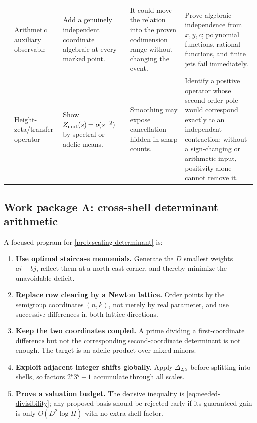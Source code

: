 \documentclass[10pt,oneside]{article}
\theoremstyle{definition}
\theoremstyle{remark}
\begin{document}
\begin{center}
\begin{longtable}{p{}p{}p{}p{}p{}}
\addlinespace
6 & Arithmetic auxiliary observable & Add a genuinely independent coordinate algebraic at every marked point. & It could move the relation into the proven codimension range without changing the event. & Prove algebraic independence from \(x,y,c\); polynomial functions, rational functions, and finite jets fail immediately. \\
\addlinespace
7 & Height-zeta/transfer operator & Show \(Z_{\rm unit}(s)=o(s^{-2})\) by spectral or adelic means. & Smoothing may expose cancellation hidden in sharp counts. & Identify a positive operator whose second-order pole would correspond exactly to an independent contraction; without a sign-changing or arithmetic input, positivity alone cannot remove it. \\
\bottomrule
\end{longtable}
\end{center}

\subsection{Work package A: cross-shell determinant arithmetic}
A focused program for \cref{prob:scaling-determinant} is:
\begin{enumerate}[label=\textbf{A\arabic*.}]
\item \textbf{Use optimal staircase monomials.}  Generate the \(D\) smallest weights \(ai+bj\), reflect them at a north-east corner, and thereby minimize the unavoidable deficit.
\item \textbf{Replace row clearing by a Newton lattice.}  Order points by the semigroup coordinates \((n,k)\), not merely by real parameter, and use successive differences in both lattice directions.
\item \textbf{Keep the two coordinates coupled.}  A prime dividing a first-coordinate difference but not the corresponding second-coordinate determinant is not enough.  The target is an adelic product over mixed minors.
\item \textbf{Exploit adjacent integer shifts globally.}  Apply \(\Delta_{2,3}\) before splitting into shells, so factors \(2^p3^q-1\) accumulate through all scales.
\item \textbf{Prove a valuation budget.}  The decisive inequality is \eqref{eq:needed-divisibility}; any proposed basis should be rejected early if its guaranteed gain is only \(O(D^2\log H)\) with no extra shell factor.
\end{enumerate}
\end{document}

